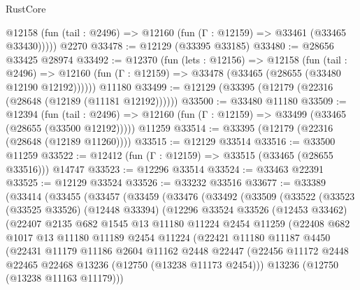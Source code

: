 \begin{lexlean}{RustCore}
\begin{coremodule}
      @12158 (fun (tail : @2496) => @12160 (fun (Γ : @12159) => @33461 (@33465 @33430)))))
    @2270
@33478 := @12129 (@33395 @33185)
@33480 := @28656 @33425 @28974
@33492 := @12370
    (fun (lets : @12156) =>
    @12158
      (fun (tail : @2496) =>
      @12160 (fun (Γ : @12159) => @33478 (@33465 (@28655 (@33480 @12190 @12192))))))
    @11180
@33499 := @12129 (@33395 (@12179 (@22316 (@28648 (@12189 (@11181 @12192))))))
@33500 := @33480 @11180
@33509 := @12394
    (fun (tail : @2496) => @12160 (fun (Γ : @12159) => @33499 (@33465 (@28655 (@33500 @12192)))))
    @11259
@33514 := @33395 (@12179 (@22316 (@28648 (@12189 @11260))))
@33515 := @12129 @33514
@33516 := @33500 @11259
@33522 := @12412 (fun (Γ : @12159) => @33515 (@33465 (@28655 @33516))) @14747
@33523 := @12296 @33514
@33524 := @33463 @22391
@33525 := @12129 @33524
@33526 := @33232 @33516
@33677 := @33389
    (@33414
      (@33455
        (@33457
          (@33459
            (@33476
              (@33492
                (@33509
                  (@33522
                    (@33523
                      (@33525 @33526)
                      (@12448 @33394)
                      (@12296
                        @33524
                        @33526
                        (@12453 @33462)
                        (@22407
                          @2135
                          @682
                          @1545
                          @13
                          @11180
                          @11224
                          @2454
                          @11259
                          (@22408
                            @682
                            @1017
                            @13
                            @11180
                            @11189
                            @2454
                            @11224
                            (@22421
                              @11180
                              @11187
                              @4450
                              (@22431
                                @11179
                                @11186
                                @2604
                                @11162
                                @2448
                                @22447
                                (@22456
                                  @11172
                                  @2448
                                  @22465
                                  @22468
                                  @13236
                                  (@12750 (@13238 @11173 @2454)))
                                @13236
                                (@12750 (@13238 @11163 @11179)))

\end{coremodule}
\end{lexlean}
